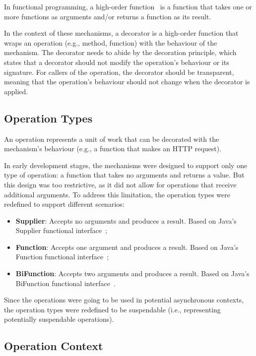 In functional programming, a high-order function~\cite{higher-order-functions} is a function
that takes one or more functions as arguments and/or returns a function as its result.

In the context of these mechanisms,
a decorator is a high-order function that wraps an operation (e.g., method, function) with the behaviour of the mechanism.
The decorator needs to abide by the decoration principle,
which states that a decorator should not modify the operation's behaviour or its signature.
For callers of the operation, the decorator should be transparent, meaning that the operation's behaviour should not change when the decorator is applied.

\subsection{Operation Types}\label{subsec:operation-types}

An operation represents a unit of work that can be decorated with the mechanism's behaviour (e.g., a function that makes an HTTP request).

In early development stages, the mechanisms were designed to support only one type of operation:
a function that takes no arguments and returns a value.
But this design was too restrictive, as it did not allow for operations that receive additional arguments.
To address this limitation, the operation types were redefined to support different scenarios:

\begin{itemize}
    \item \textbf{Supplier}: Accepts no arguments and produces a result.
    Based on Java's Supplier functional interface~\cite{java-supplier};
    \item \textbf{Function}: Accepts one argument and produces a result.
    Based on Java's Function functional interface~\cite{java-function};
    \item \textbf{BiFunction}: Accepts two arguments and produces a result.
    Based on Java's BiFunction functional interface~\cite{java-bifunction}.
\end{itemize}

Since the operations were going to be used in potential asynchronous contexts,
the operation types were redefined to be suspendable (i.e., representing potentially suspendable operations).

\subsection{Operation Context}\label{subsec:operation-context}

